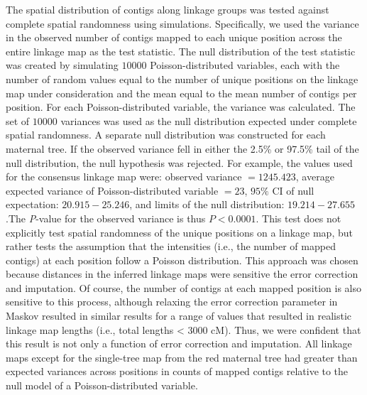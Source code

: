 \documentclass[smallextended]{svjour3}
\begin{document}
The spatial distribution of contigs along linkage groups was tested against
complete spatial randomness using simulations.  Specifically, we used the
variance in the observed number of contigs mapped to each unique position across
the entire linkage map as the test statistic. The null distribution of the test
statistic was created by simulating $10000$ Poisson-distributed variables, each
with the number of random values equal to the number of unique positions on the
linkage map under consideration and the mean equal to the mean number of contigs
per position. For each Poisson-distributed variable, the variance was
calculated. The set of $10000$ variances was used as the null distribution
expected under complete spatial randomness. A separate null distribution was
constructed for each maternal tree. If the observed variance fell in either the
2.5\% or 97.5\% tail of the null distribution, the null hypothesis was
rejected. For example, the values used for the consensus linkage map were:
observed variance $= 1245.423$, average expected variance of Poisson-distributed
variable $= 23$, $95\%$ CI of null expectation: $20.915 - 25.246$, and limits of
the null distribution: $19.214 - 27.655$.The \textit{P}-value for the observed
variance is thus $P < 0.0001$. This test does not explicitly test spatial
randomness of the unique positions on a linkage map, but rather tests the
assumption that the intensities (i.e., the number of mapped contigs) at each
position follow a Poisson distribution.  This approach was chosen because
distances in the inferred linkage maps were sensitive the error correction and
imputation. Of course, the number of contigs at each mapped position is also
sensitive to this process, although relaxing the error correction parameter in
Maskov resulted in similar results for a range of values that resulted in
realistic linkage map lengths (i.e., total lengths < $3000$ cM). Thus, we were
confident that this result is not only a function of error correction and
imputation. All linkage maps except for the single-tree map from the red
maternal tree had greater than expected variances across positions in counts of
mapped contigs relative to the null model of a Poisson-distributed variable.
\end{document}
